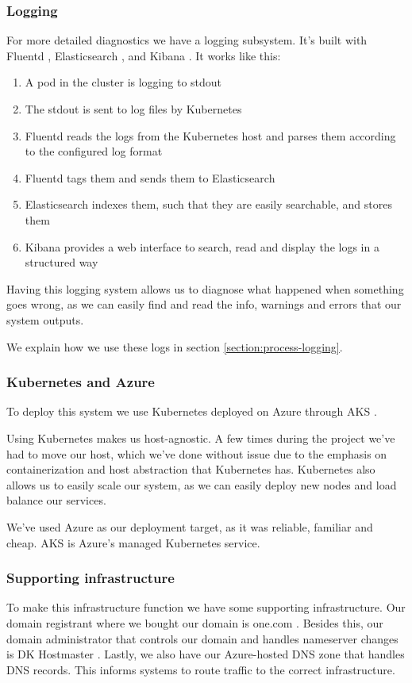 \subsubsection{Logging}
For more detailed diagnostics we have a logging subsystem. It's built with Fluentd \cite{tool:fluentd}, Elasticsearch \cite{tool:elasticsearch}, and Kibana \cite{tool:kibana}.
It works like this:
\begin{enumerate}
  \item A pod in the cluster is logging to stdout
  \item The stdout is sent to log files by Kubernetes
  \item Fluentd reads the logs from the Kubernetes host and parses them according to the configured log format
  \item Fluentd tags them and sends them to Elasticsearch
  \item Elasticsearch indexes them, such that they are easily searchable, and stores them
  \item Kibana provides a web interface to search, read and display the logs in a structured way
\end{enumerate}
Having this logging system allows us to diagnose what happened when something goes wrong, as we can easily find and read the info, warnings and errors that our system outputs.

We explain how we use these logs in section \ref{section:process-logging}.

\subsubsection{Kubernetes and Azure}
To deploy this system we use Kubernetes \cite{tool:kubernetes} deployed on Azure \cite{tool:azure} through AKS \cite{tool:aks}.

Using Kubernetes makes us host-agnostic.
A few times during the project we've had to move our host, which we've done without issue due to the emphasis on containerization and host abstraction that Kubernetes has.
Kubernetes also allows us to easily scale our system, as we can easily deploy new nodes and load balance our services.

We've used Azure as our deployment target, as it was reliable, familiar and cheap. AKS is Azure's managed Kubernetes service.

\subsubsection{Supporting infrastructure}
To make this infrastructure function we have some supporting infrastructure.
Our domain registrant where we bought our domain is one.com \cite{onecom}.
Besides this, our domain administrator that controls our domain and handles nameserver changes is DK Hostmaster \cite{dk-hostmaster}.
Lastly, we also have our Azure-hosted DNS zone \cite{tool:dns-zone} that handles DNS records. This informs systems to route traffic to the correct infrastructure.
